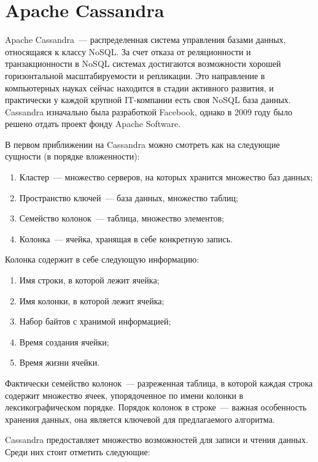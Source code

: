\section{Apache Cassandra}

Apache Cassandra~--- распределенная система управления базами данных, относящаяся к классу NoSQL. За счет отказа от реляционности и транзакционности в NoSQL системах достигаются возможности хорошей горизонтальной масштабируемости и репликации. Это направление в компьютерных науках сейчас находится в стадии активного развития, и практически у каждой крупной IT-компании есть своя NoSQL база данных. Cassandra изначально была разработкой Facebook, однако в 2009 году было решено отдать проект фонду Apache Software.

В первом приближении на Cassandra можно смотреть как на следующие сущности (в порядке вложенности):

\begin{enumerate}
	\item Кластер~--- множество серверов, на которых хранится множество баз данных;
	\item Пространство ключей~--- база данных, множество таблиц;
	\item Семейство колонок~--- таблица, множество элементов;
	\item Колонка~--- ячейка, хранящая в себе конкретную запись.
\end{enumerate}

Колонка содержит в себе следующую информацию:

\begin{enumerate}
	\item Имя строки, в которой лежит ячейка;
	\item Имя колонки, в которой лежит ячейка;
	\item Набор байтов с хранимой информацией;
	\item Время создания ячейки;
	\item Время жизни ячейки.
\end{enumerate}

Фактически семейство колонок~--- разреженная таблица, в которой каждая строка содержит множество ячеек, упорядоченное по имени колонки в лексикографическом порядке. Порядок колонок в строке~--- важная особенность хранения данных, она является ключевой для предлагаемого алгоритма.

Cassandra предоставляет множество возможностей для записи и чтения данных. Среди них стоит отметить следующие:

